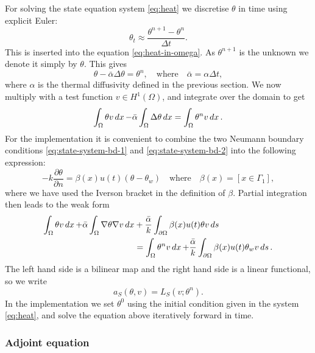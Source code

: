 For solving the state equation system \eqref{eq:heat} we discretise $\theta$ in time using explicit Euler:
\begin{equation*}
    \theta_t \approx \frac{\theta^{n+1} - \theta^n}{\Delta t}.
\end{equation*}
This is inserted into the equation \eqref{eq:heat-in-omega}. As $\theta^{n+1}$ is the unknown we denote it simply by $\theta$. This gives
\begin{equation*}
    \theta - \bar{\alpha}\Delta \theta = \theta^n, \quad\textrm{where}\quad \bar{\alpha} = \alpha\Delta t,
\end{equation*}
where $\alpha$ is the thermal diffusivity defined in the previous section. We now multiply with a test function $v\in H^1(\Omega)$, and integrate over the domain to get
\begin{equation*}
    \int_\Omega \theta v \mathop{dx} - \bar{\alpha}\int_\Omega \Delta\theta\mathop{dx} = \int_\Omega \theta^n v\mathop{dx}.
\end{equation*}
For the implementation it is convenient to combine the two Neumann boundary conditions \eqref{eq:state-system-bd-1} and \eqref{eq:state-system-bd-2} into the following expression:
\begin{equation*}
    -k\frac{\partial \theta}{\partial n} = \beta(x)u(t)(\theta - \theta_w) \quad\text{where}\quad \beta(x) = [x\in\Gamma_1],
\end{equation*}
where we have used the Iverson bracket in the definition of $\beta$. Partial integration then leads to the weak form
\begin{equation*}
\begin{aligned}
    \int_\Omega \theta v\mathop{dx} + \bar{\alpha}\int_\Omega\nabla\theta\nabla v\mathop{dx} &+ \frac{\bar{\alpha}}{k}\int_{\partial\Omega}\beta(x)u(t)\theta v\mathop{ds} \\
    &= \int_\Omega\theta^n v\mathop{dx} + \frac{\bar{\alpha}}{k}\int_{\partial\Omega}\beta(x)u(t)\theta_w v\mathop{ds}.
\end{aligned}
\end{equation*}
The left hand side is a bilinear map and the right hand side is a linear functional, so we write
\begin{equation*}
    a_S(\theta, v) = L_S(v; \theta^n).
\end{equation*}
In the implementation we set $\theta^0$ using the initial condition given in the system \eqref{eq:heat}, and solve the equation above iteratively forward in time.

\subsubsection{Adjoint equation}

